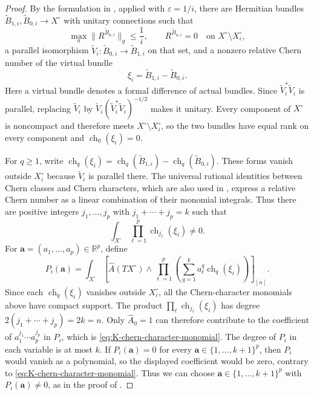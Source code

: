 \documentclass[12pt,reqno]{amsart}
\numberwithin{equation}{section}
\theoremstyle{definition}
\newcommand{\Ahat}{\widehat A}
\newcommand{\ch}{\operatorname{ch}}
\begin{document}
\begin{proof}
By the  formulation in
\cite[Theorem~5a]{GromovFourLectures}, applied with
$\varepsilon=1/i$, there are Hermitian bundles
$\widetilde B_{1,i},\widetilde B_{0,i}\to X^\circ$ with unitary
connections such that
\[
 \max_a\|R^{\widetilde B_{a,i}}\|_g\leq\frac1i,
 \qquad R^{\widetilde B_{a,i}}=0
 \quad\text{on }X^\circ\setminus X_i^\circ,
\]
a parallel isomorphism
$\widetilde V_i:\widetilde B_{0,i}\to\widetilde B_{1,i}$ on that
set, and a nonzero relative Chern number of the virtual bundle
\[
 \xi_i=\widetilde B_{1,i}-\widetilde B_{0,i}.
\]
Here a virtual bundle denotes a formal difference of actual bundles.
Since $\widetilde V_i^*\widetilde V_i$ is parallel, replacing
$\widetilde V_i$ by
$\widetilde V_i(\widetilde V_i^*\widetilde V_i)^{-1/2}$ makes it
unitary.  Every component of $X^\circ$ is noncompact and therefore
meets $X^\circ\setminus X_i^\circ$, so the two bundles have equal
rank on every component and $\ch_0(\xi_i)=0$.

For $q\geq1$, write
$\ch_q(\xi_i)=\ch_q(\widetilde B_{1,i})-\ch_q(\widetilde B_{0,i})$.
These forms vanish outside $X_i^\circ$ because $\widetilde V_i$ is
parallel there.  The universal rational identities between Chern
classes and Chern characters, which are also used in
\cite[\S2]{BaerHankeKCowaist}, express a relative Chern number as a
linear combination of their monomial integrals.  Thus there are
positive integers $j_1,\ldots,j_p$ with $j_1+\cdots+j_p=k$ such that
\begin{equation}\label{eq:K-chern-character-monomial}
 \int_{X^\circ}\prod_{\ell=1}^p\ch_{j_\ell}(\xi_i)\ne0.
\end{equation}
For $\mathbf a=(a_1,\ldots,a_p)\in\mathbb R^p$, define
\begin{equation}\label{eq:K-Adams-polynomial}
 P_i(\mathbf a)=
 \int_{X^\circ}
 \left[
 \Ahat(TX^\circ)\wedge
 \prod_{\ell=1}^p
 \left(\sum_{q=1}^k a_\ell^q\ch_q(\xi_i)\right)
 \right]_{[n]}.
\end{equation}
Since each $\ch_q(\xi_i)$ vanishes outside $X_i^\circ$, all the
Chern-character monomials above have compact support. The product $\prod_\ell\ch_{j_\ell}(\xi_i)$ has degree
$2(j_1+\cdots+j_p)=2k=n$.  Only $\Ahat_0=1$ can therefore
contribute to the coefficient of $a_1^{j_1}\cdots a_p^{j_p}$ in
$P_i$, which is \eqref{eq:K-chern-character-monomial}.
The degree of $P_i$ in each variable is at most $k$.  If
$P_i(\mathbf a)=0$ for every
$\mathbf a\in\{1,\ldots,k+1\}^p$, then $P_i$ would vanish as a
polynomial, so the displayed coefficient would be zero, contrary to
\eqref{eq:K-chern-character-monomial}.  Thus we can choose
$\mathbf a\in\{1,\ldots,k+1\}^p$ with $P_i(\mathbf a)\ne0$,
as in the proof of \cite[Lemma~5]{BaerHankeKCowaist}.


\end{proof}
\end{document}
